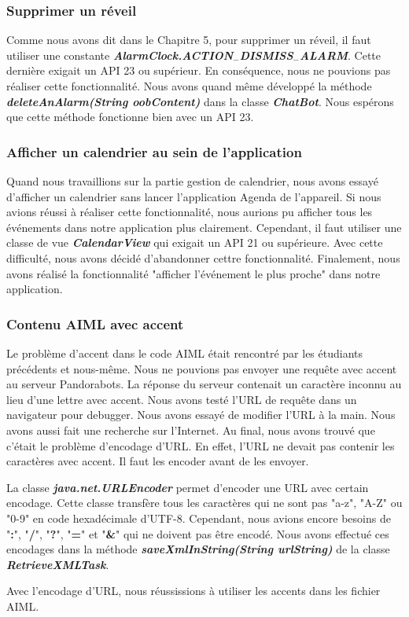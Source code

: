 \subsubsection{Supprimer un réveil}

\indent Comme nous avons dit dans le Chapitre 5, pour supprimer un réveil, il faut utiliser une constante \textbf{\emph{AlarmClock.ACTION$_-$DISMISS$_-$ALARM}}. Cette dernière exigait un API 23 ou supérieur. En conséquence, nous ne pouvions pas réaliser cette fonctionnalité. Nous avons quand même développé la méthode \textbf{\emph{deleteAnAlarm(String oobContent)}} dans la classe \textbf{\emph{ChatBot}}. Nous espérons que cette méthode fonctionne bien avec un API 23.

\subsubsection{Afficher un calendrier au sein de l'application}

\indent Quand nous travaillions sur la partie gestion de calendrier, nous avons essayé d'afficher un calendrier sans lancer l'application Agenda de l'appareil. Si nous avions réussi à réaliser cette fonctionnalité, nous aurions pu afficher tous les événements dans notre application plus clairement. Cependant, il faut utiliser une classe de vue \textbf{\emph{CalendarView}} qui exigait un API 21 ou supérieure. Avec cette difficulté, nous avons décidé d'abandonner cettre fonctionnalité. Finalement, nous avons réalisé la fonctionnalité "afficher l'événement le plus proche" dans notre application. 

\subsubsection{Contenu AIML avec accent}

\indent Le problème d'accent dans le code AIML était rencontré par les étudiants précédents et nous-même. Nous ne pouvions pas envoyer une requête avec accent au serveur Pandorabots. La réponse du serveur contenait un caractère inconnu au lieu d'une lettre avec accent. Nous avons testé l'URL de requête dans un navigateur pour debugger. Nous avons essayé de modifier l'URL à la main. Nous avons aussi fait une recherche sur l'Internet. Au final, nous avons trouvé que c'était le problème d'encodage d'URL. En effet, l'URL ne devait pas contenir les caractères avec accent. Il faut les encoder avant de les envoyer.

\indent La classe \textbf{\emph{java.net.URLEncoder}} permet d'encoder une URL avec certain encodage. Cette classe transfère tous les caractères qui ne sont pas "a-z", "A-Z" ou "0-9" en code hexadécimale d'UTF-8. Cependant, nous avions encore besoins de "\textbf{:}", "\textbf{/}", "\textbf{?}", "\textbf{=}" et "\textbf{\&}" qui ne doivent pas être encodé. Nous avons effectué ces encodages dans la méthode \textbf{\emph{saveXmlInString(String urlString)}} de la classe \textbf{\emph{RetrieveXMLTask}}. 

\indent Avec l'encodage d'URL, nous réussissions à utiliser les accents dans les fichier AIML.

\newpage
